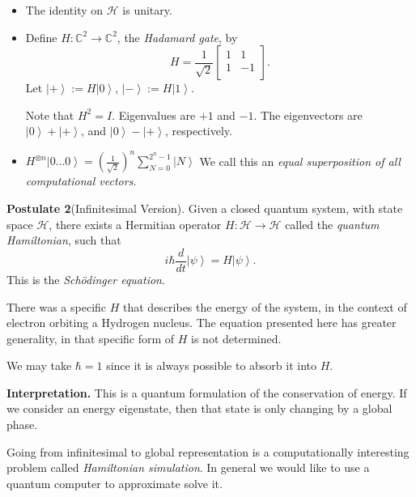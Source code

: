 \begin{example}
	\begin{itemize}
		\item The identity on $\mathscr{H}$ is unitary.
		\item Define $H: \mathbb{C}^2 \to \mathbb{C}^2$, the \textit{Hadamard gate}, by
			\[
				H = \frac{1}{\sqrt{2} } 
				\begin{bmatrix}
					1 & 1 \\
					1 & -1 \\
				\end{bmatrix}
			.\] 
		Let $\left| + \right\rangle := H \left| 0 \right\rangle $, $\left| - \right\rangle := H \left| 1 \right\rangle $.

		Note that $H^2 = I$. Eigenvalues are $+1$ and $-1$. The eigenvectors are $\left| 0 \right\rangle  + \left| + \right\rangle $, and $\left| 0 \right\rangle - \left| + \right\rangle $, respectively. 

	\item $H^{\otimes n} \left| 0 \ldots 0 \right\rangle = \left( \frac{1}{\sqrt{2} } \right) ^n \sum_{N = 0}^{2^n - 1} \left| N \right\rangle $
		We call this an \textit{equal superposition of all computational vectors.}
\end{itemize}
\end{example}

\textbf{Postulate 2}(Infinitesimal Version). Given a closed quantum system, with state space $\mathscr{H}$, there exists a Hermitian operator $H: \mathscr{H} \to  \mathscr{H}$ called the \textit{quantum Hamiltonian}, such that 
\[
	i \hbar \frac{d}{dt } \left| \psi \right\rangle = H \left| \psi \right\rangle 
.\] 
This is the \textit{Sch\"odinger equation}.

\begin{remark}
	There was a specific $H$ that describes the energy of the system, in the context of electron orbiting a Hydrogen nucleus. The equation presented here has greater generality, in that specific form of $H$ is not determined.
\end{remark}

We may take $\hbar = 1$ since it is always possible to absorb it into $H$.

\textbf{Interpretation.} This is a quantum formulation of the conservation of energy. If we consider an energy eigenstate, then that state is only changing by a global phase.

Going from infinitesimal to global representation is a computationally interesting problem called \textit{Hamiltonian simulation}. In general we would like to use a quantum computer to approximate solve it.

